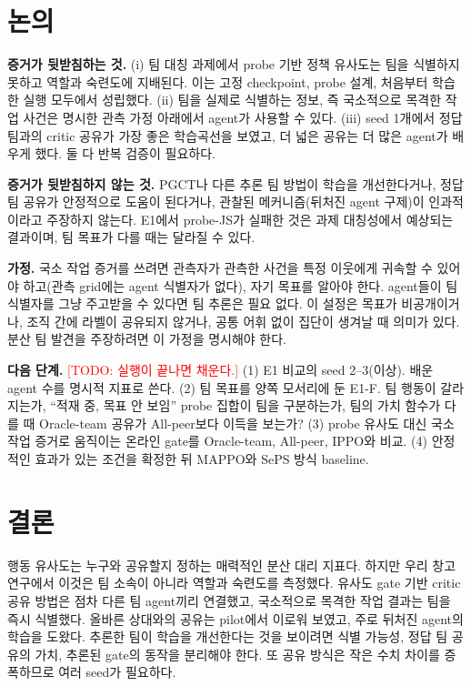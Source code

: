 \documentclass[twocolumn,10pt]{article}
\newcommand{\todo}[1]{\textcolor{red}{[TODO: #1]}}
\begin{document}
\section{논의}
\textbf{증거가 뒷받침하는 것.} (i) 팀 대칭 과제에서 probe 기반 정책 유사도는 팀을 식별하지 못하고 역할과 숙련도에 지배된다.
이는 고정 checkpoint, probe 설계, 처음부터 학습한 실행 모두에서 성립했다. (ii) 팀을 실제로 식별하는 정보, 즉 국소적으로
목격한 작업 사건은 명시한 관측 가정 아래에서 agent가 사용할 수 있다. (iii) seed 1개에서 정답 팀과의 critic 공유가 가장 좋은
학습곡선을 보였고, 더 넓은 공유는 더 많은 agent가 배우게 했다. 둘 다 반복 검증이 필요하다.

\textbf{증거가 뒷받침하지 않는 것.} PGCT나 다른 추론 팀 방법이 학습을 개선한다거나, 정답 팀 공유가 안정적으로 도움이 된다거나,
관찰된 메커니즘(뒤처진 agent 구제)이 인과적이라고 주장하지 않는다. E1에서 probe-JS가 실패한 것은 과제 대칭성에서 예상되는
결과이며, 팀 목표가 다를 때는 달라질 수 있다.

\textbf{가정.} 국소 작업 증거를 쓰려면 관측자가 관측한 사건을 특정 이웃에게 귀속할 수 있어야 하고(관측 grid에는 agent 식별자가
없다), 자기 목표를 알아야 한다. agent들이 팀 식별자를 그냥 주고받을 수 있다면 팀 추론은 필요 없다. 이 설정은 목표가 비공개이거나,
조직 간에 라벨이 공유되지 않거나, 공통 어휘 없이 집단이 생겨날 때 의미가 있다. 분산 팀 발견을 주장하려면 이 가정을 명시해야 한다.

\textbf{다음 단계.} \todo{실행이 끝나면 채운다.} (1) E1 비교의 seed 2--3(이상). 배운 agent 수를 명시적 지표로 쓴다.
(2) 팀 목표를 양쪽 모서리에 둔 E1-F. 팀 행동이 갈라지는가, ``적재 중, 목표 안 보임'' probe 집합이 팀을 구분하는가,
팀의 가치 함수가 다를 때 Oracle-team 공유가 All-peer보다 이득을 보는가? (3) probe 유사도 대신 국소 작업 증거로 움직이는 온라인
gate를 Oracle-team, All-peer, IPPO와 비교. (4) 안정적인 효과가 있는 조건을 확정한 뒤 MAPPO와 SePS 방식 baseline.

\section{결론}
행동 유사도는 누구와 공유할지 정하는 매력적인 분산 대리 지표다. 하지만 우리 창고 연구에서 이것은 팀 소속이 아니라 역할과
숙련도를 측정했다. 유사도 gate 기반 critic 공유 방법은 점차 다른 팀 agent끼리 연결했고, 국소적으로 목격한 작업 결과는 팀을 즉시
식별했다. 올바른 상대와의 공유는 pilot에서 이로워 보였고, 주로 뒤처진 agent의 학습을 도왔다. 추론한 팀이 학습을 개선한다는
것을 보이려면 식별 가능성, 정답 팀 공유의 가치, 추론된 gate의 동작을 분리해야 한다. 또 공유 방식은 작은 수치 차이를 증폭하므로
여러 seed가 필요하다.
\end{document}
